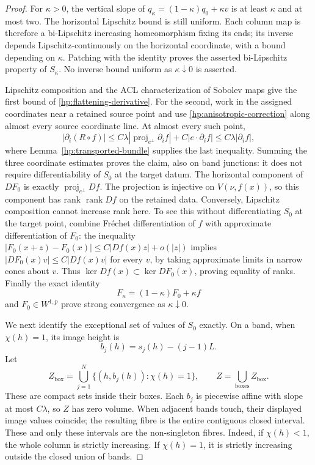 \documentclass[11pt]{article}
\numberwithin{equation}{section}
\theoremstyle{definition}
\theoremstyle{remark}
\begin{document}
\begin{proof}
For $\kappa>0$, the vertical slope of
$q_\kappa=(1-\kappa)q_0+\kappa v$ is at least $\kappa$ and at most
two.  The horizontal Lipschitz bound is still uniform.  Each column
map is therefore a bi-Lipschitz increasing homeomorphism fixing its
ends; its inverse depends Lipschitz-continuously on the horizontal
coordinate, with a bound depending on $\kappa$.  Patching with the
identity proves the asserted bi-Lipschitz property of $S_\kappa$.
No inverse bound uniform as $\kappa\downarrow0$ is asserted.

Lipschitz composition and the ACL characterization of Sobolev maps
give the first bound of \eqref{hp:flattening-derivative}.  For the
second, work in the assigned coordinates near a retained source
point and use \eqref{hp:anisotropic-correction} along almost every
source coordinate line.  At almost every such point,
\[
 |\partial_i(R\circ f)|
 \le C\lambda|\operatorname{proj}_{e^\perp}\partial_i f|
       +C|e\cdot\partial_i f|
 \le C\lambda|\partial_i f|,
\]
where Lemma~\ref{hp:transported-bundle} supplies the last inequality.
Summing the three coordinate estimates proves the claim, also on
band junctions: it does not require differentiability of $S_0$ at
the target datum.  The horizontal component of $DF_0$ is exactly
$\operatorname{proj}_{e^\perp}Df$.  The projection is injective on
$V(\nu,f(x))$, so this component has rank $\operatorname{rank} Df$ on the
retained data.  Conversely, Lipschitz composition cannot increase
rank here.  To see this without differentiating $S_0$ at the target
point, combine Fr\'echet differentiation of $f$ with approximate
differentiation of $F_0$: the inequality
$|F_0(x+z)-F_0(x)|\le C|Df(x)z|+o(|z|)$ implies
$|DF_0(x)v|\le C|Df(x)v|$ for every $v$, by taking approximate
limits in narrow cones about $v$.  Thus
$\ker Df(x)\subset\ker DF_0(x)$, proving equality of ranks.
Finally the exact identity
\[
 F_\kappa=(1-\kappa)F_0+\kappa f
\]
and $F_0\in W^{1,p}$ prove strong convergence as $\kappa\downarrow0$.

We next identify the exceptional set of values of $S_0$ exactly.
On a band, when $\chi(h)=1$, its image height is
\[
 b_j(h)=s_j(h)-(j-1)L.
\]
Let
\begin{equation}\label{hp:collapsed-values}
 Z_{\mathrm{box}}=
   \bigcup_{j=1}^N\{(h,b_j(h)):\chi(h)=1\},
 \qquad Z=\bigcup_{\mathrm{boxes}}Z_{\mathrm{box}}.
\end{equation}
These are compact sets inside their boxes.  Each $b_j$ is piecewise
affine with slope at most $C\lambda$, so $Z$ has zero volume.
When adjacent bands touch, their displayed image values coincide;
the resulting fibre is the entire contiguous closed interval.
These and only these intervals are the non-singleton fibres.  Indeed,
if $\chi(h)<1$, the whole column is strictly increasing.  If
$\chi(h)=1$, it is strictly increasing outside the closed union of
bands.


\end{proof}
\end{document}
